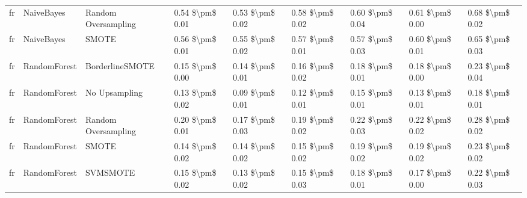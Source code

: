 \begin{tabular}{lllllllll}
      fr &                      NaiveBayes &           Random Oversampling &     0.54 \$\textbackslash pm\$ 0.01 &           0.53 \$\textbackslash pm\$ 0.02 &       0.58 \$\textbackslash pm\$ 0.02 &        0.60 \$\textbackslash pm\$ 0.04 &                         0.61 \$\textbackslash pm\$ 0.00 &     0.68 \$\textbackslash pm\$ 0.02 \\
      fr &                      NaiveBayes &                         SMOTE &     0.56 \$\textbackslash pm\$ 0.01 &           0.55 \$\textbackslash pm\$ 0.02 &       0.57 \$\textbackslash pm\$ 0.01 &        0.57 \$\textbackslash pm\$ 0.03 &                         0.60 \$\textbackslash pm\$ 0.01 &     0.65 \$\textbackslash pm\$ 0.03 \\
      fr &                    RandomForest &               BorderlineSMOTE &     0.15 \$\textbackslash pm\$ 0.00 &           0.14 \$\textbackslash pm\$ 0.01 &       0.16 \$\textbackslash pm\$ 0.02 &        0.18 \$\textbackslash pm\$ 0.01 &                         0.18 \$\textbackslash pm\$ 0.00 &     0.23 \$\textbackslash pm\$ 0.04 \\
      fr &                    RandomForest &                 No Upsampling &     0.13 \$\textbackslash pm\$ 0.02 &           0.09 \$\textbackslash pm\$ 0.01 &       0.12 \$\textbackslash pm\$ 0.01 &        0.15 \$\textbackslash pm\$ 0.01 &                         0.13 \$\textbackslash pm\$ 0.01 &     0.18 \$\textbackslash pm\$ 0.01 \\
      fr &                    RandomForest &           Random Oversampling &     0.20 \$\textbackslash pm\$ 0.01 &           0.17 \$\textbackslash pm\$ 0.03 &       0.19 \$\textbackslash pm\$ 0.02 &        0.22 \$\textbackslash pm\$ 0.03 &                         0.22 \$\textbackslash pm\$ 0.02 &     0.28 \$\textbackslash pm\$ 0.02 \\
      fr &                    RandomForest &                         SMOTE &     0.14 \$\textbackslash pm\$ 0.02 &           0.14 \$\textbackslash pm\$ 0.02 &       0.15 \$\textbackslash pm\$ 0.02 &        0.19 \$\textbackslash pm\$ 0.02 &                         0.19 \$\textbackslash pm\$ 0.02 &     0.23 \$\textbackslash pm\$ 0.02 \\
      fr &                    RandomForest &                      SVMSMOTE &     0.15 \$\textbackslash pm\$ 0.02 &           0.13 \$\textbackslash pm\$ 0.02 &       0.15 \$\textbackslash pm\$ 0.03 &        0.18 \$\textbackslash pm\$ 0.01 &                         0.17 \$\textbackslash pm\$ 0.00 &     0.22 \$\textbackslash pm\$ 0.03 \\

\end{tabular}
